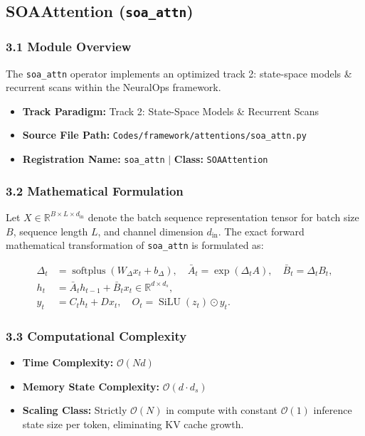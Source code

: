 \subsection{SOAAttention (\texttt{soa\_attn})}
\label{sec:app_module_soa\_attn}

\subsubsection*{3.1 Module Overview}
The \texttt{soa\_attn} operator implements an optimized track 2: state-space models \& recurrent scans within the NeuralOps framework.
\begin{itemize}
    \item \textbf{Track Paradigm:} Track 2: State-Space Models & Recurrent Scans
    \item \textbf{Source File Path:} \texttt{Codes/framework/attentions/soa\_attn.py}
    \item \textbf{Registration Name:} \texttt{soa\_attn} $\mid$ \textbf{Class:} \texttt{SOAAttention}
\end{itemize}

\subsubsection*{3.2 Mathematical Formulation}
Let $X \in \mathbb{R}^{B \times L \times d_{\text{in}}}$ denote the batch sequence representation tensor for batch size $B$, sequence length $L$, and channel dimension $d_{\text{in}}$. The exact forward mathematical transformation of \texttt{soa\_attn} is formulated as:

\begin{align}
\Delta_t &= \operatorname{softplus}(W_\Delta x_t + b_\Delta), \quad \bar{A}_t = \exp(\Delta_t A), \quad \bar{B}_t = \Delta_t B_t, \\
h_t &= \bar{A}_t h_{t-1} + \bar{B}_t x_t \in \mathbb{R}^{d \times d_s}, \\
y_t &= C_t h_t + D x_t, \quad O_t = \operatorname{SiLU}(z_t) \odot y_t.
\end{align}


\subsubsection*{3.3 Computational Complexity}
\begin{itemize}
    \item \textbf{Time Complexity:} $\mathcal{O}(N d)$
    \item \textbf{Memory State Complexity:} $\mathcal{O}(d \cdot d_s)$
    \item \textbf{Scaling Class:} Strictly $\mathcal{O}(N)$ in compute with constant $\mathcal{O}(1)$ inference state size per token, eliminating KV cache growth.
\end{itemize}

